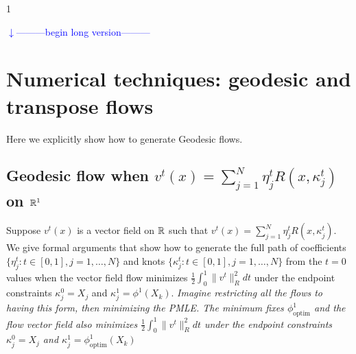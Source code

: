 \documentclass[noinfoline]{imsart}
\def\Ver{1}
\def\LongVer{1}
\begin{document}
\if\Ver\LongVer{ 
{\flushleft\textcolor{blue}{$\downarrow$---------begin long version---------}}\newline


\section{Numerical techniques: geodesic and transpose flows}
Here we explicitly show how to generate Geodesic flows.



\subsection{Geodesic flow  when  $v^t(x)=\sum_{j=1}^N \eta^t_j R(x,\kappa^t_j) $ on $\Bbb R^1$}
Suppose $v^t(x)$ is a vector field on $\Bbb R$ such that $v^t(x)=\sum_{j=1}^N \eta^t_j R(x,\kappa^t_j)$.
We give formal arguments that  show how to generate the full path of coefficients $\{\eta^t_j: t\in [0,1], j=1,\ldots, N\}$ and knots $\{\kappa^t_j: t\in [0,1], j=1,\ldots, N\}$ from the $t=0$ values when the vector field flow minimizes $\frac{1}{2}\int_0^1 \| v^t  \|^2_R dt$ under the endpoint constraints $\kappa_j^{0}=X_j$ and $\kappa_j^{1}=\phi^1(X_k)$. {\em Imagine restricting all the flows to having this form, then minimizing the PMLE. The minimum fixes $\phi_\text{optim}^1$ and the flow vector field also minimizes  $\frac{1}{2}\int_0^1 \| v^t  \|^2_R dt$ under the endpoint constraints $\kappa_j^{0}=X_j$ and $\kappa_j^{1}=\phi_\text{optim}^1(X_k)$}

}
\end{document}

